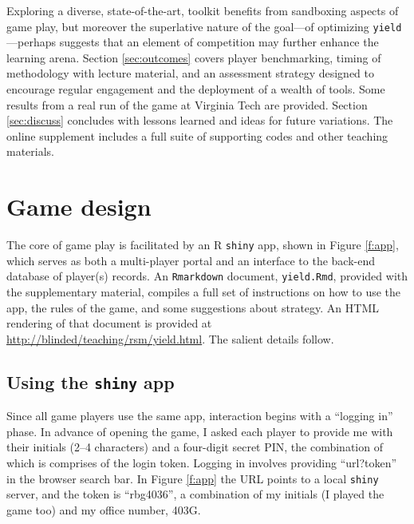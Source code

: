 \documentclass[12pt]{article}
\begin{document}
Exploring a diverse, state-of-the-art, toolkit benefits from sandboxing
aspects of game play, but moreover the superlative nature of the goal---of
optimizing {\tt yield}---perhaps suggests that an element of competition may
further enhance the learning arena.  Section \ref{sec:outcomes} covers player
benchmarking, timing of methodology with lecture material, and an assessment
strategy designed to encourage regular engagement and the deployment of a
wealth of tools.  Some results from a real run of the game at Virginia Tech
are provided.  Section \ref{sec:discuss} concludes with lessons learned and
ideas for future variations.  The online supplement includes a full suite of
supporting codes and other teaching materials.

\section{Game design}
\label{sec:game}

The core of game play is facilitated by an {\sf R} {\tt shiny} app, shown in
Figure \ref{f:app}, which serves as both a multi-player portal and an
interface to the back-end database of player(s) records.  An {\tt Rmarkdown}
document, {\tt yield.Rmd}, provided with the supplementary material, compiles
a full set of instructions on how to use the app, the rules of the game, and
some suggestions about strategy.  An HTML rendering of that document is
provided at \url{http://blinded/teaching/rsm/yield.html}.  The
salient details follow.

\subsection{Using the {\tt shiny} app}

Since all game players use the same app, interaction begins with a ``logging
in'' phase.  In advance of opening the game, I asked each player to provide me
with their initials (2--4 characters) and a four-digit secret PIN, the
combination of which is comprises of the login token.  Logging in involves
providing ``url?token'' in the browser search bar.  In Figure \ref{f:app} the
URL points to a local {\tt shiny} server, and the token is ``rbg4036'', a
combination of my initials (I played the game too) and my office number, 403G.
\end{document}
